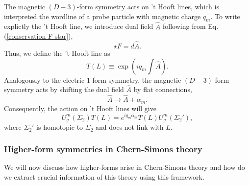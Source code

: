 \documentclass{article}
\begin{document}
The magnetic $(D-3)$-form symmetry acts on 't Hooft lines, which is interpreted the wordline of a probe particle with magnetic charge $q_m$. To write explictly the 't Hooft line, we introduce dual field $\hat{A}$ following from Eq.(\ref{conservation F star}),
\begin{equation}
	\star F = d\hat{A}.
\end{equation}
Thus, we define the 't Hooft line as 
\begin{equation}
	T(L) \equiv \exp\left(iq_m\int \hat{A}\right).
\end{equation}
Analogously to the electric 1-form symmetry, the magnetic $(D-3)$-form symmetry acts by shifting the dual field $\hat{A}$ by flat connections,
\begin{equation}
	\hat{A} \to \hat{A} + \alpha_m.
\end{equation}
Consequently, the action on 't Hooft lines will give 
\begin{equation}
	U_g^m(\Sigma_2)T(L) = e^{iq_m\alpha_m}T(L)U_g^m(\Sigma_2'),
\end{equation}
where $\Sigma_2'$ is homotopic to $\Sigma_2$ and does not link with $L$. 
\subsubsection{Higher-form symmetries in Chern-Simons theory}
We will now discuss how higher-forms arise in Chern-Simons theory and how do we extract crucial information of this theory using this framework.
\end{document}
